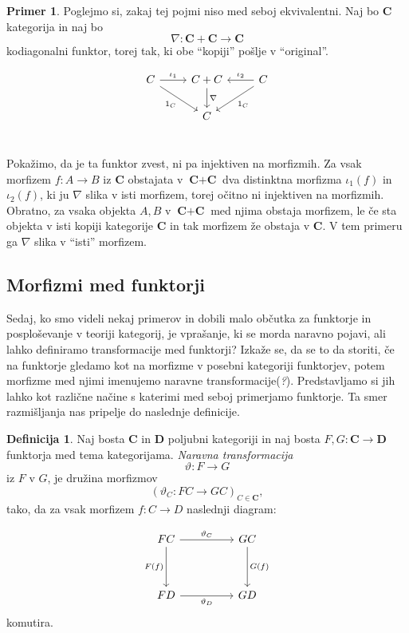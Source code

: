 \documentclass[12pt,a4paper]{book}
\theoremstyle{definition}
\newtheorem{definicija}{Definicija}[chapter]
\theoremstyle{plain}
\theoremstyle{definition}
\newtheorem{primer}{Primer}[section]
\theoremstyle{remark}
\newcommand{\cat}[1]{\textbf{#1}}
\begin{document}
\begin{primer}
Poglejmo si, zakaj tej pojmi niso med seboj ekvivalentni. Naj bo $\cat{C}$ kategorija in naj bo 
$$\nabla : \cat{C} + \cat{C} \to \cat{C}$$ 
kodiagonalni funktor, torej tak, ki obe "`kopiji"' pošlje v "`original"'.

$$\begin{tikzcd}[column sep=normal]
C \ar[r, "\iota_1"] \ar[dr, "1_C"'] & C + C \ar[d, "\nabla"] & C \ar[l, "\iota_2"'] \ar[dl, "1_C"] \\
& C & \\
\end{tikzcd}$$

Pokažimo, da je ta funktor zvest, ni pa injektiven na morfizmih. 
Za vsak morfizem $f : A \to B$ iz $\cat{C}$ obstajata v $\cat{C} + \cat{C}$ dva distinktna morfizma $\iota_1(f)$ in $\iota_2(f)$, ki ju $\nabla$ slika v isti morfizem, torej očitno ni injektiven na morfizmih. Obratno, za vsaka objekta $A,B$ v $\cat{C} + \cat{C}$ med njima obstaja morfizem, le če sta objekta v isti kopiji kategorije $\cat{C}$ in tak morfizem že obstaja v $\cat{C}$. V tem primeru ga $\nabla$ slika v "`isti"' morfizem.

\end{primer}

\subsection{Morfizmi med funktorji}
Sedaj, ko smo videli nekaj primerov in dobili malo občutka za funktorje in posploševanje v teoriji kategorij, je vprašanje, ki se morda naravno pojavi, ali lahko definiramo transformacije med funktorji? Izkaže se, da se to da storiti, če na funktorje gledamo kot na morfizme v posebni kategoriji funktorjev, potem morfizme med njimi imenujemo naravne transformacije(\emph ?). Predstavljamo si jih lahko kot različne načine s katerimi med seboj primerjamo funktorje. Ta smer razmišljanja nas pripelje do naslednje definicije.

\begin{definicija}
Naj bosta $\cat{C}$ in $\cat{D}$ poljubni kategoriji in naj bosta $F,G : \cat{C} \to \cat{D}$ funktorja med tema kategorijama.
\emph{Naravna transformacija} 
$$\vartheta : F \to G$$
iz $F$ v $G$, je družina morfizmov
$$(\vartheta_C : FC \to GC)_{C \in \cat{C}},$$
tako, da za vsak morfizem $f : C \to D$ naslednji diagram:

\begin{equation}
\begin{tikzcd}[sep=huge]
FC \arrow[r, "\vartheta_C"] \arrow[d, "F(f)"'] & GC \arrow[d, "G(f)"] \\
FD \arrow[r, "\vartheta_D"'] & GD
\end{tikzcd}
\end{equation}
komutira.
\end{definicija}
\end{document}
